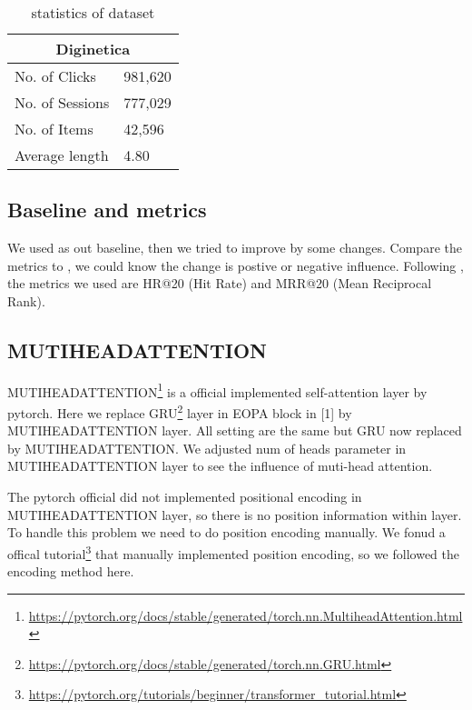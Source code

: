 \documentclass{article}
\begin{document}
\begin{table}
    \caption{statistics of dataset}
    \label{data-stats}
    \centering
    \begin{tabular}{ll}
        \toprule
        \multicolumn{2}{c}{Diginetica} \\
        \midrule
        No. of Clicks   & 981,620      \\
        No. of Sessions & 777,029      \\
        No. of Items    & 42,596       \\
        Average length  & 4.80         \\
        \bottomrule
    \end{tabular}
\end{table}

\subsection{Baseline and metrics}

We used \cite{chen2020lessr} as out baseline,
then we tried to improve \cite{chen2020lessr} by some changes.
Compare the metrics to \cite{chen2020lessr},
we could know the change is postive or negative influence.
Following \cite{chen2020lessr},
the metrics we used are HR@20 (Hit Rate) and MRR@20 (Mean Reciprocal Rank).

\subsection{MUTIHEADATTENTION}

MUTIHEADATTENTION\footnote{\url{https://pytorch.org/docs/stable/generated/torch.nn.MultiheadAttention.html}}
is a official implemented self-attention layer by pytorch.
Here we replace GRU\footnote{\url{https://pytorch.org/docs/stable/generated/torch.nn.GRU.html}} layer in EOPA block in [1] by MUTIHEADATTENTION layer. All setting are the same but GRU now replaced by MUTIHEADATTENTION. We adjusted num of heads parameter in MUTIHEADATTENTION layer to see the influence of muti-head attention.

The pytorch official did not implemented positional encoding in MUTIHEADATTENTION layer, so there is no position information within layer. To handle this problem we need to do position encoding manually. We fonud a offical tutorial\footnote{\url{https://pytorch.org/tutorials/beginner/transformer_tutorial.html}} that manually implemented position encoding, so we followed the encoding method here.
\end{document}
